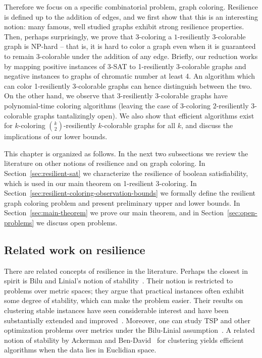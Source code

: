 Therefore we focus on a specific combinatorial problem, graph coloring.
Resilience is defined up to the addition of edges, and we first show that this
is an interesting notion: many famous, well studied graphs exhibit strong
resilience properties. Then, perhaps surprisingly, we prove that $3$-coloring a
$1$-resiliently 3-colorable graph is NP-hard -- that is, it is hard to color a
graph even when it is guaranteed to remain $3$-colorable under the addition of
any edge. Briefly, our reduction works by mapping positive instances of 3-SAT
to 1-resiliently 3-colorable graphs and negative instances to graphs of
chromatic number at least 4. An algorithm which can color 1-resiliently
3-colorable graphs can hence distinguish between the two. On the other hand, we
observe that $3$-resiliently $3$-colorable graphs have polynomial-time coloring
algorithms (leaving the case of 3-coloring $2$-resiliently $3$-colorable graphs
tantalizingly open). We also show that efficient algorithms exist for
$k$-coloring $\binom{k}{2}$-resiliently $k$-colorable graphs for all $k$, and
discuss the implications of our lower bounds. 

This chapter is organized as follows. In the next two subsections we review the
literature on other notions of resilience and on graph coloring. In
Section~\ref{sec:resilient-sat} we characterize the resilience of boolean
satisfiability, which is used in our main theorem on 1-resilient 3-coloring. In
Section~\ref{sec:resilient-coloring-observation-bounds} we formally define the
resilient graph coloring problem and present preliminary upper and lower
bounds. In Section~\ref{sec:main-theorem} we prove our main theorem, and in
Section~\ref{sec:open-problems} we discuss open problems.


\subsection{Related work on resilience}

There are related concepts of resilience in the literature. Perhaps the closest
in spirit is Bilu and Linial's notion of stability~\cite{BL12}.  Their notion
is restricted to problems over metric spaces; they argue that practical
instances often exhibit some degree of stability, which can make the problem
easier.  Their results on clustering stable instances have seen considerable
interest and have been substantially extended and
improved~\cite{ABS10,BL12,Rey11}.  Moreover, one can study TSP and other
optimization problems over metrics under the Bilu-Linial
assumption~\cite{MSSW11}.  A related notion of stability by Ackerman and
Ben-David~\cite{AckermanB09} for clustering yields efficient algorithms when
the data lies in Euclidian space.

